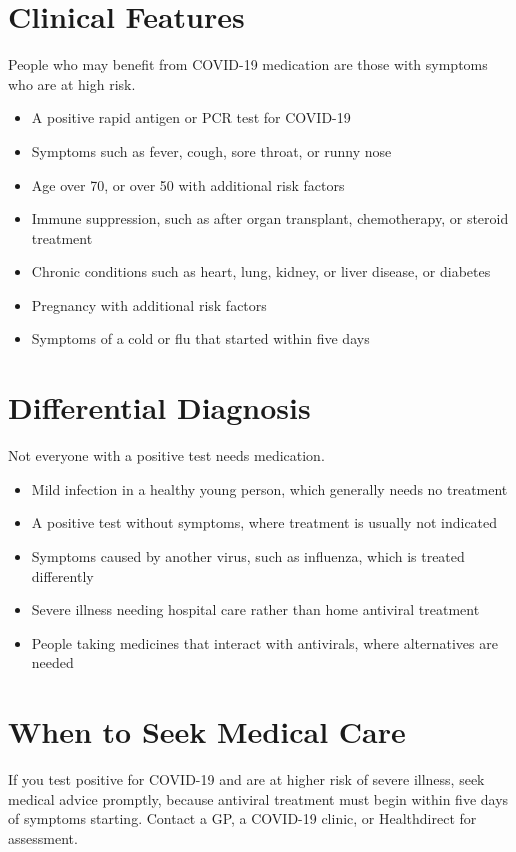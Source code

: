 \section*{Clinical Features}
People who may benefit from COVID-19 medication are those with symptoms who are at high risk.

\begin{itemize}
    \item A positive rapid antigen or PCR test for COVID-19
    \item Symptoms such as fever, cough, sore throat, or runny nose
    \item Age over 70, or over 50 with additional risk factors
    \item Immune suppression, such as after organ transplant, chemotherapy, or steroid treatment
    \item Chronic conditions such as heart, lung, kidney, or liver disease, or diabetes
    \item Pregnancy with additional risk factors
    \item Symptoms of a cold or flu that started within five days
\end{itemize}

\section*{Differential Diagnosis}
Not everyone with a positive test needs medication.

\begin{itemize}
    \item Mild infection in a healthy young person, which generally needs no treatment
    \item A positive test without symptoms, where treatment is usually not indicated
    \item Symptoms caused by another virus, such as influenza, which is treated differently
    \item Severe illness needing hospital care rather than home antiviral treatment
    \item People taking medicines that interact with antivirals, where alternatives are needed
\end{itemize}

\section*{When to Seek Medical Care}
If you test positive for COVID-19 and are at higher risk of severe illness, seek medical advice promptly, because antiviral treatment must begin within five days of symptoms starting. Contact a GP, a COVID-19 clinic, or Healthdirect for assessment.

